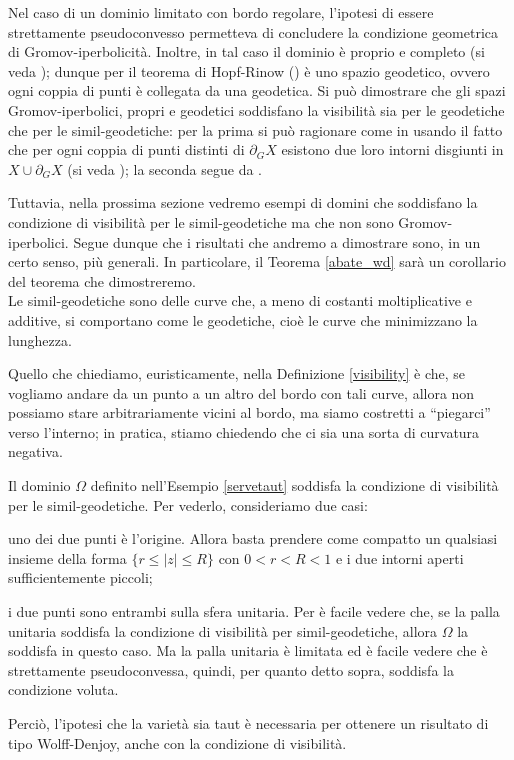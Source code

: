 Nel caso di un dominio limitato con bordo regolare, l'ipotesi di essere strettamente pseudoconvesso permetteva di concludere la condizione geometrica di Gromov-iperbolicità. Inoltre, in tal caso il dominio è proprio e completo (si veda \cite[Paragraph 3.3]{G}); dunque per il teorema di Hopf-Rinow (\cite[Part I, Paragraph 3, Proposition 3.7]{BH}) è uno spazio geodetico, ovvero ogni coppia di punti è collegata da una geodetica. Si può dimostrare che gli spazi Gromov-iperbolici, propri e geodetici soddisfano la visibilità sia per le geodetiche che per le simil-geodetiche: per la prima si può ragionare come in \cite[Proposition 2.5]{BNT} usando il fatto che per ogni coppia di punti distinti di $\partial_G X$ esistono due loro intorni disgiunti in $X\cup\partial_GX$ (si veda \cite[Part III, Chapter H, Paragraph 3, Lemma 3.6]{BH}); la seconda segue da \cite[Part III, Chapter H, Paragraph 1, Theorem 1.7]{BH}.

Tuttavia, nella prossima sezione vedremo esempi di domini che soddisfano la condizione di visibilità per le simil-geodetiche ma che non sono Gromov-iperbolici. Segue dunque che i risultati che andremo a dimostrare sono, in un certo senso, più generali. In particolare, il Teorema \ref{abate_wd} sarà un corollario del teorema che dimostreremo. \\

Le simil-geodetiche sono delle curve che, a meno di costanti moltiplicative e additive, si comportano come le geodetiche, cioè le curve che minimizzano la lunghezza.

Quello che chiediamo, euristicamente, nella Definizione \ref{visibility} è che, se vogliamo andare da un punto a un altro del bordo con tali curve, allora non possiamo stare arbitrariamente vicini al bordo, ma siamo costretti a ``piegarci'' verso l'interno; in pratica, stiamo chiedendo che ci sia una sorta di curvatura negativa. \\

\begin{ftt}
    Il dominio $\Omega$ definito nell'Esempio \ref{servetaut} soddisfa la condizione di visibilità per le simil-geodetiche. Per vederlo, consideriamo due casi:
    \begin{nlist}
        \item uno dei due punti è l'origine. Allora basta prendere come compatto un qualsiasi insieme della forma $\{r \le |z| \le R\}$ con $0<r<R<1$ e i due intorni aperti sufficientemente piccoli;
        \item i due punti sono entrambi sulla sfera unitaria. Per \cite[Proposition 6]{NTT} è facile vedere che, se la palla unitaria soddisfa la condizione di visibilità per simil-geodetiche, allora $\Omega$ la soddisfa in questo caso. Ma la palla unitaria è limitata ed è facile vedere che è strettamente pseudoconvessa, quindi, per quanto detto sopra, soddisfa la condizione voluta.
    \end{nlist}
    Perciò, l'ipotesi che la varietà sia taut è necessaria per ottenere un risultato di tipo Wolff-Denjoy, anche con la condizione di visibilità.
\end{ftt}